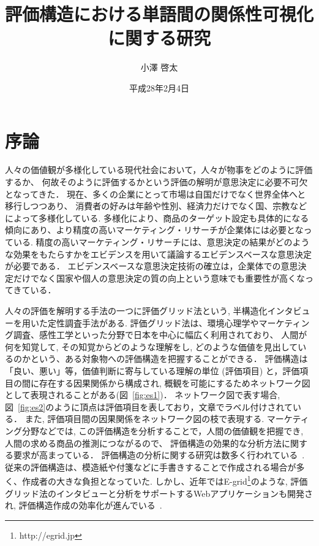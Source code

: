 \documentclass[syuuron]{kuee}
\title{評価構造における単語間の関係性可視化に関する研究}
\author{小澤 啓太}
\date{平成28年2月4日}
\begin{document}
\maketitle
\tableofcontents


\chapter{序論}
	人々の価値観が多様化している現代社会において，人々が物事をどのように評価するか、
	何故そのように評価するかという評価の解明が意思決定に必要不可欠となってきた．
	現在、多くの企業にとって市場は自国だけでなく世界全体へと移行しつつあり、
	消費者の好みは年齢や性別、経済力だけでなく国、宗教などによって多様化している. 
	多様化により、商品のターゲット設定も具体的になる傾向にあり、より精度の高いマーケティング・リサーチが企業体には必要となっている. 
	精度の高いマーケティング・リサーチには、意思決定の結果がどのような効果をもたらすかをエビデンスを用いて議論するエビデンスベースな意思決定が必要である．
	エビデンスベースな意思決定技術の確立は，企業体での意思決定だけでなく国家や個人の意思決定の質の向上という意味でも重要性が高くなってきている．
	
	人々の評価を解明する手法の一つに評価グリッド法という, 半構造化インタビューを用いた定性調査手法がある. 
	評価グリッド法は、環境心理学やマーケティング調査、感性工学といった分野で日本を中心に幅広く利用されており、
	人間が何を知覚して, その知覚からどのような理解をし, どのような価値を見出しているのかという、ある対象物への評価構造を把握することができる．
	評価構造は「良い、悪い」等，価値判断に寄与している理解の単位 (評価項目) と，評価項目の間に存在する因果関係から構成され, 
	概観を可能にするためネットワーク図として表現されることがある(図~\ref{fig:es1})．
	ネットワーク図で表す場合, 図~\ref{fig:es2}のように頂点は評価項目を表しており，文章でラベル付けされている．
	また, 評価項目間の因果関係をネットワーク図の枝で表現する. 
	マーケティング分野などでは, この評価構造を分析することで，人間の価値観を把握でき, 人間の求める商品の推測につながるので、
	評価構造の効果的な分析方法に関する要求が高まっている\cite{egm6, egm7}．
	評価構造の分析に関する研究は数多く行われている~\cite{egm8, egm9}. 
	従来の評価構造は、模造紙や付箋などに手書きすることで作成される場合が多く、作成者の大きな負担となっていた. 
	しかし、近年ではE-grid\footnote{http://egrid.jp}のような, 評価グリッド法のインタビューと分析をサポートするWebアプリケーションも開発され, 評価構造作成の効率化が進んでいる~\cite{egm5, egm6}. 
	
\end{document}
